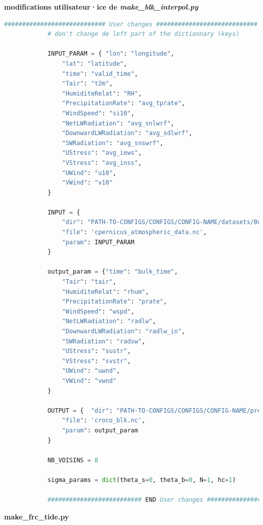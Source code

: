 \documentclass[10pt,a4paper,titlepage]{article}
\begin{document}
    \begin{codeEnv}{\textbf{modifications utilisateur·ice de \textit{make\_blk\_interpol.py}}}
        \begin{lstlisting}[language=python]
            ############################ User changes ############################
            # don't change de left part of the dictionnary (keys)
            
            INPUT_PARAM = {	"lon": "longitude",
                "lat": "latitude",
                "time": "valid_time",
                "Tair": "t2m",
                "HumiditeRelat": "RH",
                "PrecipitationRate": "avg_tprate",
                "WindSpeed": "si10",
                "NetLWRadiation": "avg_snlwrf",
                "DownwardLWRadiation": "avg_sdlwrf",
                "SWRadiation": "avg_snswrf",
                "UStress": "avg_iews",
                "VStress": "avg_inss",
                "UWind": "u10",
                "VWind": "v10"
            }
            
            INPUT = {
                "dir": "PATH-TO-CONFIGS/CONFIGS/CONFIG-NAME/datasets/Bulk/",
                "file": 'cpernicus_atmospheric_data.nc',
                "param": INPUT_PARAM
            }
            
            output_param = {"time": "bulk_time",
                "Tair": "tair",
                "HumiditeRelat": "rhum",
                "PrecipitationRate": "prate",
                "WindSpeed": "wspd",
                "NetLWRadiation": "radlw",
                "DownwardLWRadiation": "radlw_in",
                "SWRadiation": "radsw",
                "UStress": "sustr",
                "VStress": "svstr",
                "UWind": "uwnd",
                "VWind": "vwnd"
            }
            
            OUTPUT = {	"dir": "PATH-TO-CONFIGS/CONFIGS/CONFIG-NAME/preproOUTPUT/",
                "file": 'croco_blk.nc',
                "param": output_param
            }
            
            NB_VOISINS = 8
            
            sigma_params = dict(theta_s=0, theta_b=0, N=1, hc=1)
            
            ########################## END User changes ##########################
        \end{lstlisting}
    \end{codeEnv}
    
    \textbf{make\_frc\_tide.py}
    
\end{document}
